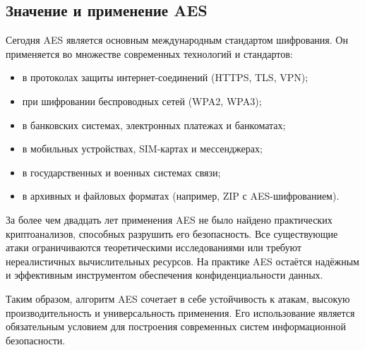 \subsection{Значение и применение AES}

Сегодня AES является основным международным стандартом шифрования. Он применяется во множестве современных технологий и стандартов:  

\begin{itemize}
	\item в протоколах защиты интернет-соединений (HTTPS, TLS, VPN);  
	\item при шифровании беспроводных сетей (WPA2, WPA3);  
	\item в банковских системах, электронных платежах и банкоматах;  
	\item в мобильных устройствах, SIM-картах и мессенджерах;  
	\item в государственных и военных системах связи;  
	\item в архивных и файловых форматах (например, ZIP с AES-шифрованием).  
\end{itemize}

За более чем двадцать лет применения AES не было найдено практических криптоанализов, способных разрушить его безопасность. Все существующие атаки ограничиваются теоретическими исследованиями или требуют нереалистичных вычислительных ресурсов. На практике AES остаётся надёжным и эффективным инструментом обеспечения конфиденциальности данных.  

Таким образом, алгоритм AES сочетает в себе устойчивость к атакам, высокую производительность и универсальность применения. Его использование является обязательным условием для построения современных систем информационной безопасности.  
